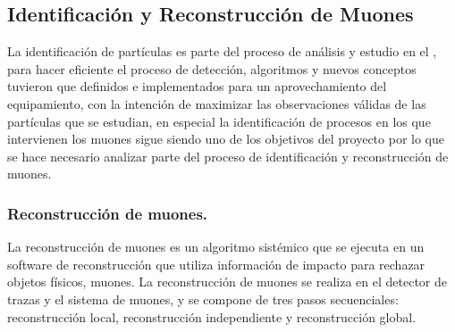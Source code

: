 \subsection{Identificación y Reconstrucción de Muones}

La identificación de partículas es parte del proceso de análisis y estudio en el \LHC, para hacer eficiente el proceso de detección, algoritmos y nuevos conceptos tuvieron que definidos e implementados para un aprovechamiento del equipamiento, con la intención de maximizar las observaciones válidas de las partículas que se estudian, en especial la identificación de procesos en los que intervienen los muones sigue siendo uno de los objetivos del proyecto por lo que se hace necesario analizar parte del proceso de identificación y reconstrucción de muones.

\subsubsection{Reconstrucción de muones.}
La reconstrucción de muones es un algoritmo sistémico que se ejecuta en un software de reconstrucción que utiliza información de impacto para rechazar objetos físicos, muones. La reconstrucción de muones se realiza en el detector de trazas y el sistema de muones, y se compone de tres pasos secuenciales: reconstrucción local, reconstrucción independiente y reconstrucción global. 

